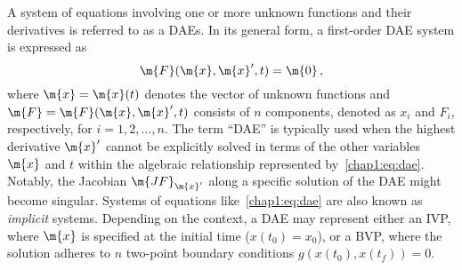 A system of equations involving one or more unknown functions and their derivatives is referred to as a \acp{DAE}. In its general form, a first-order \ac{DAE} system is expressed as
%
\begin{equation}
  \m{F}(\m{x}, \m{x}^{\prime}, t) = \m{0} \, \text{,}
  \label{chap1:eq:dae}
\end{equation}
%
where $\m{x} = \m{x}(t)$ denotes the vector of unknown functions and $\m{F} = \m{F}(\m{x}, \m{x}^{\prime}, t)$ consists of $n$ components, denoted as $x_i$ and $F_i$, respectively, for $i = 1, 2, \dots, n$. The term ``\ac{DAE}'' is typically used when the highest derivative $\m{x}^{\prime}$ cannot be explicitly solved in terms of the other variables $\m{x}$ and $t$ within the algebraic relationship represented by~\eqref{chap1:eq:dae}. Notably, the Jacobian $\m{JF}_{\m{x}^{\prime}}$ along a specific solution of the \ac{DAE} might become singular. Systems of equations like~\eqref{chap1:eq:dae} are also known as \emph{implicit} systems. Depending on the context, a \ac{DAE} may represent either an \ac{IVP}, where $\m{x}$ is specified at the initial time ($x(t_0) = x_0$), or a \ac{BVP}, where the solution adheres to $n$ two-point boundary conditions $g(x(t_0), x(t_f)) = 0$.


